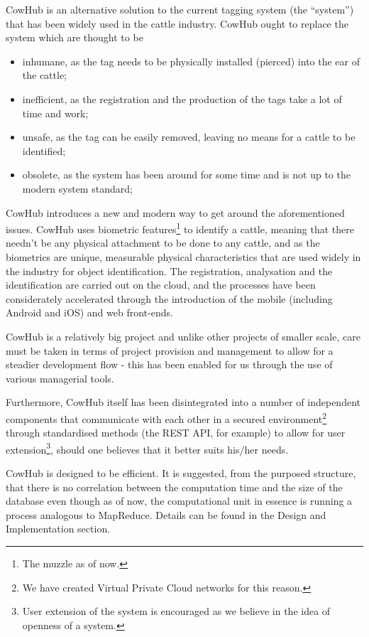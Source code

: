 CowHub is an alternative solution to the current tagging system (the ``system'') that has been widely used in the cattle industry. CowHub ought to replace the system which are thought to be 
\begin{itemize}
	\item inhumane, as the tag needs to be physically installed (pierced) into the ear of the cattle;
	\item inefficient, as the registration and the production of the tags take a lot of time and work;
	\item unsafe, as the tag can be easily removed, leaving no means for a cattle to be identified;
	\item obsolete, as the system has been around for some time and is not up to the modern system standard; 
\end{itemize}

CowHub introduces a new and modern way to get around the aforementioned issues. CowHub uses biometric features\footnote{The muzzle as of now.} to identify a cattle, meaning that there needn't be any physical attachment to be done to any cattle, and as the biometrics are unique, measurable physical characteristics that are used widely in the industry for object identification\cite{biometrics}. The registration, analysation and the identification are carried out on the cloud, and the processes have been considerately accelerated through the introduction of the mobile (including Android and iOS) and web front-ends.

CowHub is a relatively big project and unlike other projects of smaller scale, care must be taken in terms of project provision and management to allow for a steadier development flow - this has been enabled for us through the use of various managerial tools. 

Furthermore, CowHub itself has been disintegrated into a number of independent components that communicate with each other in a secured environment\footnote{We have created Virtual Private Cloud networks for this reason.} through standardised methods (the REST API, for example) to allow for user extension\footnote{User extension of the system is encouraged as we believe in the idea of openness of a system.}, should one believes that it better suits his/her needs.

CowHub is designed to be efficient. It is suggested, from the purposed structure, that there is no correlation between the computation time and the size of the database even though as of now, the computational unit in essence is running a process analogous to MapReduce. Details can be found in the Design and Implementation section.